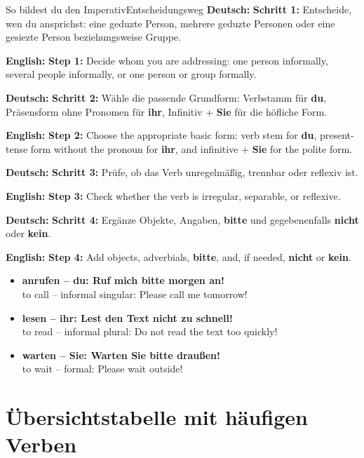 \documentclass[a4paper,11pt]{article}
\newcommand{\GermanText}[1]{\textbf{Deutsch: }#1\par}
\newcommand{\EnglishText}[1]{{\small\color{SoftGray}\textbf{English: }#1\par}}
\newcommand{\ExampleItem}[2]{\item \textbf{#1}\\{\small\color{SoftGray}#2}}
\begin{document}
        \begin{grammarentry}{So bildest du den Imperativ}{Entscheidungsweg}
            \GermanText{\textbf{Schritt 1:} Entscheide, wen du ansprichst: eine geduzte Person, mehrere geduzte Personen oder eine gesiezte Person beziehungsweise Gruppe.}
            \EnglishText{\textbf{Step 1:} Decide whom you are addressing: one person informally, several people informally, or one person or group formally.}

            \GermanText{\textbf{Schritt 2:} Wähle die passende Grundform: Verbstamm für \textbf{du}, Präsensform ohne Pronomen für \textbf{ihr}, Infinitiv + \textbf{Sie} für die höfliche Form.}
            \EnglishText{\textbf{Step 2:} Choose the appropriate basic form: verb stem for \textbf{du}, present-tense form without the pronoun for \textbf{ihr}, and infinitive + \textbf{Sie} for the polite form.}

            \GermanText{\textbf{Schritt 3:} Prüfe, ob das Verb unregelmäßig, trennbar oder reflexiv ist.}
            \EnglishText{\textbf{Step 3:} Check whether the verb is irregular, separable, or reflexive.}

            \GermanText{\textbf{Schritt 4:} Ergänze Objekte, Angaben, \textbf{bitte} und gegebenenfalls \textbf{nicht} oder \textbf{kein}.}
            \EnglishText{\textbf{Step 4:} Add objects, adverbials, \textbf{bitte}, and, if needed, \textbf{nicht} or \textbf{kein}.}
        \end{grammarentry}

        \begin{exbox}
            \begin{itemize}
                \ExampleItem{anrufen -- du: Ruf mich bitte morgen an!}{to call -- informal singular: Please call me tomorrow!}
                \ExampleItem{lesen -- ihr: Lest den Text nicht zu schnell!}{to read -- informal plural: Do not read the text too quickly!}
                \ExampleItem{warten -- Sie: Warten Sie bitte draußen!}{to wait -- formal: Please wait outside!}
            \end{itemize}
        \end{exbox}

    \section{Übersichtstabelle mit häufigen Verben}
\end{document}
